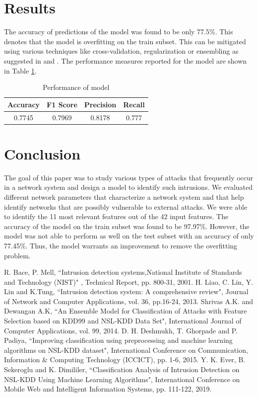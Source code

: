 \documentclass[conference]{IEEEtran}
\begin{document}
\section{Results}
The accuracy of predictions of the model was found to be only 77.5\%. This denotes that the model is overfitting on the train subset. This can be mitigated using various techniques like cross-validation, regularization or ensembling as suggested in \cite{b3} and \cite{b4}. The performance measures reported for the model are shown in Table \ref{tab3}.
\begin{table}[htbp]
\caption{Performance of model}
\begin{center}
\begin{tabular}{|c|c|c|c|}
\hline
Accuracy	&	F1 Score	&	Precision	&	Recall	\\
\hline
0.7745 &	 0.7969  &	 0.8178  &	0.777\\
\hline
\end{tabular}
\label{tab3}
\end{center}
\end{table}

\section{Conclusion}
The goal of this paper was to study various types of attacks that frequently occur in a network system and design a model to identify such intrusions. We evaluated different network parameters that characterize a network system and that help identify networks that are possibly vulnerable to external attacks. We were able to identify the 11 most relevant features out of the 42 input features. The accuracy of the model on the train subset was found to be 97.97\%. However, the model was not able to perform as well on the test subset with an accuracy of only 77.45\%. Thus, the model warrants an improvement to remove the overfitting problem.

\begin{thebibliography}{00}
 R. Bace, P. Mell, ``Intrusion detection systems,National Institute of Standards and
Technology (NIST)" , Technical Report, pp. 800-31, 2001.
 H. Liao, C. Lin, Y. Lin and K.Tung, ``Intrusion detection system: A comprehensive review", Journal of Network and Computer Applications, vol. 36, pp.16-24, 2013.
 Shrivas A.K. and Dewangan A.K, ``An Ensemble Model for Classification of Attacks with Feature Selection based on KDD99 and
NSL-KDD Data Set", International Journal of Computer Applications, vol. 99, 2014.
 D. H. Deshmukh, T. Ghorpade and P. Padiya, ``Improving classification using preprocessing and machine learning algorithms on NSL-KDD dataset", International Conference on Communication, Information & Computing Technology (ICCICT), pp. 1-6, 2015.
 Y. K. Ever, B. Sekeroglu and K. Dimililer, ``Classification Analysis of Intrusion Detection on NSL-KDD Using Machine Learning Algorithms", International Conference on Mobile Web and Intelligent Information Systems, pp. 111-122, 2019.
\end{thebibliography}
\end{document}
